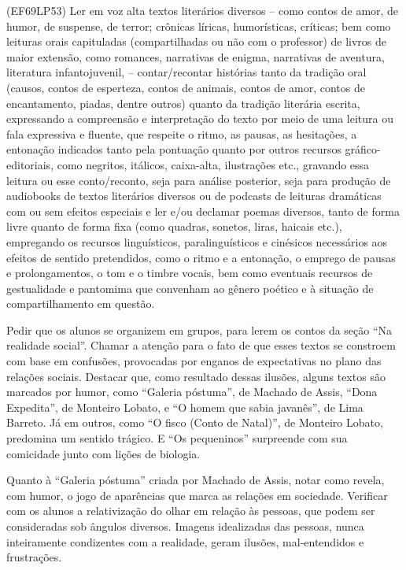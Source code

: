 (EF69LP53) Ler em voz alta textos literários diversos – como contos de amor, de humor, de suspense, de terror; crônicas líricas, humorísticas, críticas; bem como leituras orais capituladas (compartilhadas ou não com o professor) de livros de maior extensão, como romances, narrativas de enigma, narrativas de aventura, literatura infantojuvenil, – contar/recontar histórias tanto da tradição oral (causos, contos de esperteza, contos de animais, contos de amor, contos de encantamento, piadas, dentre outros) quanto da tradição literária escrita, expressando a compreensão e interpretação do texto por meio de uma leitura ou fala expressiva e fluente, que respeite o ritmo, as pausas, as hesitações, a entonação indicados tanto pela pontuação quanto por outros recursos gráfico-editoriais, como negritos, itálicos, caixa-alta, ilustrações etc., gravando essa leitura ou esse conto/reconto, seja para análise posterior, seja para produção de audiobooks de textos literários diversos ou de podcasts de leituras dramáticas com ou sem efeitos especiais e ler e/ou declamar poemas diversos, tanto de forma livre quanto de forma fixa (como quadras, sonetos, liras, haicais etc.), empregando os recursos linguísticos, paralinguísticos e cinésicos necessários aos efeitos de sentido pretendidos, como o ritmo e a entonação, o emprego de pausas e prolongamentos, o tom e o timbre vocais, bem como eventuais recursos de gestualidade e pantomima que convenham ao gênero poético e à situação de compartilhamento em questão.

Pedir que os alunos se organizem em grupos, para lerem os contos da
seção ``Na realidade social''. Chamar a atenção para o fato de que esses
textos se constroem com base em confusões, provocadas por enganos de
expectativas no plano das relações sociais. Destacar que, como resultado
dessas ilusões, alguns textos são marcados por humor, como ``Galeria
póstuma'', de Machado de Assis, ``Dona Expedita'', de Monteiro Lobato, e
``O homem que sabia javanês'', de Lima Barreto. Já em outros, como ``O
fisco (Conto de Natal)'', de Monteiro Lobato, predomina um sentido
trágico. E ``Os pequeninos'' surpreende com sua comicidade junto com
lições de biologia.

Quanto à ``Galeria póstuma'' criada por Machado de Assis, notar como
revela, com humor, o jogo de aparências que marca as relações em
sociedade. Verificar com os alunos a relativização do olhar em relação
às pessoas, que podem ser consideradas sob ângulos diversos. Imagens
idealizadas das pessoas, nunca inteiramente condizentes com a realidade,
geram ilusões, mal-entendidos e frustrações.

